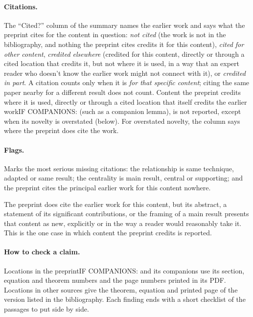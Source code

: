 \paragraph{Citations.}
The ``Cited?'' column of the summary names the earlier work and says what the
preprint cites for the content in question: \emph{not cited} (the work is not
in the bibliography, and nothing the preprint cites credits it for this
content), \emph{cited for other content}, \emph{credited elsewhere} (credited
for this content, directly or through a cited location that credits it, but
not where it is used, in a way that an expert reader who doesn't know the earlier work might not connect with it), or \emph{credited in part}. A citation counts only when it is \emph{for that specific content};
citing the same paper nearby for a different result does not count. Content
the preprint credits where it is used, directly or through a cited location
that itself credits the earlier work{IF COMPANIONS: (such as a companion
lemma)}, is not reported, except when its novelty is overstated (below). For
overstated novelty, the column says where the preprint does cite the work.

\paragraph{Flags.}
\begin{description}[leftmargin=1.5em,font=\normalfont\bfseries]
\item[Attribution gap.] Marks the most serious missing citations: the
relationship is same technique, adapted or same result; the centrality is main
result, central or supporting; and the preprint cites the principal earlier
work for this content nowhere.
\item[Overstated novelty.] The preprint does cite the earlier work for this
content, but its abstract, a statement of its significant contributions, or the framing of
a main result presents that content as new, explicitly or in the way a reader
would reasonably take it. This is the one case in which content the preprint
credits is reported.
\end{description}

\paragraph{How to check a claim.}
Locations in the preprint{IF COMPANIONS: and its companions} use its section,
equation and theorem numbers and the page numbers printed in its PDF.
Locations in other sources give the theorem, equation and printed page of the
version listed in the bibliography. Each finding ends with a short checklist
of the passages to put side by side.

